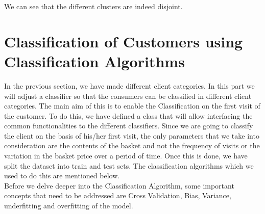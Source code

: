 We can see that the different clusters are indeed disjoint.

\section*{Classification of Customers using Classification Algorithms}

In the previous section, we have made different client categories. In this part we will adjust a classifier so that the consumers can be classified in different client categories. The main aim of this is to enable the Classification on the first visit of the customer. To do this, we have defined a class that will allow interfacing the common functionalities to the different classifiers. Since we are going to classify the client on the basis of his/her first visit, the only parameters that we take into consideration are the contents of the basket and not the frequency of visits or the variation in the basket price over a period of time. Once this is done, we have split the dataset into train and test sets. The classification algorithms which we used to do this are mentioned below.\\
Before we delve deeper into the Classification Algorithm, some important concepts that need to be addressed are Cross Validation, Bias, Variance, underfitting and overfitting of the model.

